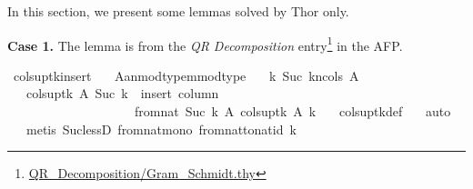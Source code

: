 \documentclass{article}
\begin{document}
In this section, we present some lemmas solved by Thor only.


{\bf Case 1.} The lemma  is from the \emph{QR Decomposition} entry\footnote{\url{QR_Decomposition/Gram_Schmidt.thy}} in the AFP.
\begin{mdframed}
\begin{isabelle}
\isamarkupfalse \ cols{\isacharunderscore}{\kern0pt}upt{\isacharunderscore}{\kern0pt}k{\isacharunderscore}{\kern0pt}insert{\isacharcolon}{\kern0pt}\isanewline
\ \ \ A{\isacharcolon}{\kern0pt}{\isacharcolon}{\kern0pt}{\isachardoublequoteopen}{\isacharprime}{\kern0pt}a{\isacharcircum}{\kern0pt}{\isacharprime}{\kern0pt}n{\isacharcolon}{\kern0pt}{\isacharcolon}{\kern0pt}{\isacharbraceleft}{\kern0pt}mod{\isacharunderscore}{\kern0pt}type{\isacharbraceright}{\kern0pt}{\isacharcircum}{\kern0pt}{\isacharprime}{\kern0pt}m{\isacharcolon}{\kern0pt}{\isacharcolon}{\kern0pt}{\isacharbraceleft}{\kern0pt}mod{\isacharunderscore}{\kern0pt}type{\isacharbraceright}{\kern0pt}{\isachardoublequoteclose}\isanewline
\ \ \ k{\isacharcolon}{\kern0pt}\ {\isachardoublequoteopen}{\isacharparenleft}{\kern0pt}Suc\ k{\isacharparenright}{\kern0pt}{\isacharless}{\kern0pt}ncols\ A{\isachardoublequoteclose}\isanewline
\ \ \ {\isachardoublequoteopen}cols{\isacharunderscore}{\kern0pt}upt{\isacharunderscore}{\kern0pt}k\ A\ {\isacharparenleft}{\kern0pt}Suc\ k{\isacharparenright}{\kern0pt}\ {\isacharequal}{\kern0pt}\ {\isacharparenleft}{\kern0pt}insert\ {\isacharparenleft}{\kern0pt}column\ \isanewline
\ \ \ \ \ \ \ \ \ \ \ \ \ \ \ \ \ \ \ \ {\isacharparenleft}{\kern0pt}from{\isacharunderscore}{\kern0pt}nat\ {\isacharparenleft}{\kern0pt}Suc\ k{\isacharparenright}{\kern0pt}{\isacharparenright}{\kern0pt}\ A{\isacharparenright}{\kern0pt}\ {\isacharparenleft}{\kern0pt}cols{\isacharunderscore}{\kern0pt}upt{\isacharunderscore}{\kern0pt}k\ A\ k{\isacharparenright}{\kern0pt}{\isacharparenright}{\kern0pt}{\isachardoublequoteclose}\isanewline
\ \ \isamarkupfalse \ cols{\isacharunderscore}{\kern0pt}upt{\isacharunderscore}{\kern0pt}k{\isacharunderscore}{\kern0pt}def\isanewline
\ \ \isamarkupfalse \ {\isacharparenleft}{\kern0pt}auto{\isacharparenright}{\kern0pt}\isanewline
\ \ \isamarkupfalse \ {\isacharparenleft}{\kern0pt}metis\ Suc{\isacharunderscore}{\kern0pt}lessD\ from{\isacharunderscore}{\kern0pt}nat{\isacharunderscore}{\kern0pt}mono{\isacharprime}{\kern0pt}\ from{\isacharunderscore}{\kern0pt}nat{\isacharunderscore}{\kern0pt}to{\isacharunderscore}{\kern0pt}nat{\isacharunderscore}{\kern0pt}id\ k\ \isanewline

\end{isabelle}
\end{mdframed}
\end{document}
